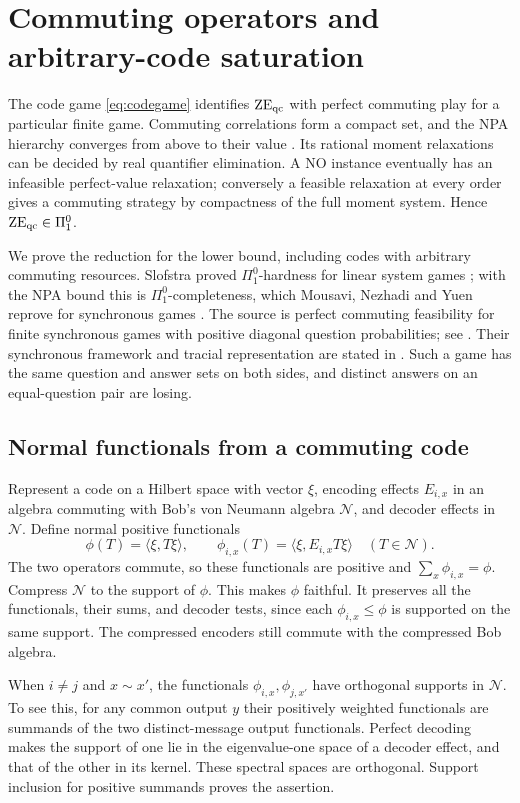 \section{Commuting operators and arbitrary-code saturation}\label{sec:commuting}
The code game \eqref{eq:codegame} identifies $\mathrm{ZE}_{\mathrm{qc}}$ with perfect commuting play for a particular finite game. Commuting correlations form a compact set, and the NPA hierarchy converges from above to their value \cite{NPA}. Its rational moment relaxations can be decided by real quantifier elimination. A NO instance eventually has an infeasible perfect-value relaxation; conversely a feasible relaxation at every order gives a commuting strategy by compactness of the full moment system. Hence $\mathrm{ZE}_{\mathrm{qc}}\in\Pi^0_1$.

We prove the reduction for the lower bound, including codes with arbitrary commuting resources. Slofstra proved $\Pi^0_1$-hardness for linear system games \cite{Slofstra}; with the NPA bound this is $\Pi^0_1$-completeness, which Mousavi, Nezhadi and Yuen reprove for synchronous games \cite[Theorem~6.4]{MNY}. The source is perfect commuting feasibility for finite synchronous games with positive diagonal question probabilities; see \cite[Theorem~6.4 and Section~1.3]{MNY}. Their synchronous framework and tracial representation are stated in \cite[Theorem~1.6]{MNY}. Such a game has the same question and answer sets on both sides, and distinct answers on an equal-question pair are losing.

\subsection{Normal functionals from a commuting code}
Represent a code on a Hilbert space with vector $\xi$, encoding effects $E_{i,x}$ in an algebra commuting with Bob's von Neumann algebra $\mathcal N$, and decoder effects in $\mathcal N$. Define normal positive functionals
\[
 \phi(T)=\langle\xi,T\xi\rangle,\qquad
 \phi_{i,x}(T)=\langle\xi,E_{i,x}T\xi\rangle\quad(T\in\mathcal N).
\]
The two operators commute, so these functionals are positive and $\sum_x\phi_{i,x}=\phi$. Compress $\mathcal N$ to the support of $\phi$. This makes $\phi$ faithful. It preserves all the functionals, their sums, and decoder tests, since each $\phi_{i,x}\leq\phi$ is supported on the same support. The compressed encoders still commute with the compressed Bob algebra.

When $i\ne j$ and $x\sim x'$, the functionals $\phi_{i,x},\phi_{j,x'}$ have orthogonal supports in $\mathcal N$. To see this, for any common output $y$ their positively weighted functionals are summands of the two distinct-message output functionals. Perfect decoding makes the support of one lie in the eigenvalue-one space of a decoder effect, and that of the other in its kernel. These spectral spaces are orthogonal. Support inclusion for positive summands proves the assertion.

